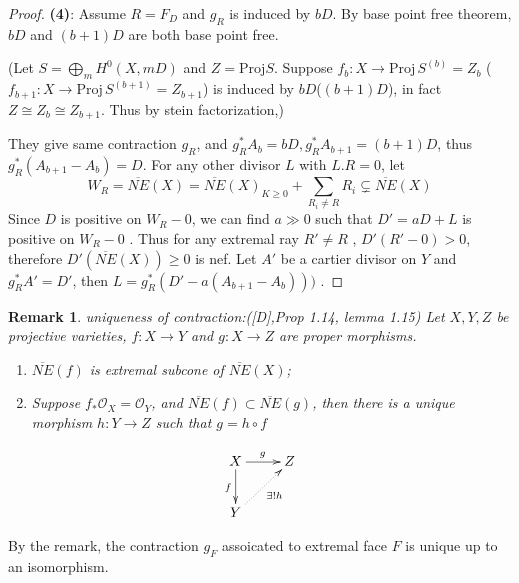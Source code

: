 \documentclass{article}
\newtheorem{rmk}[defn]{Remark}
\begin{document}
\begin{proof}
 \textbf{(4)}: Assume $ R=F_D $ and $ g_R $ is induced by $ bD $. By base point free theorem, $ bD $ and $ (b+1)D $ are both base point free.
 
  (Let $ S=\bigoplus_mH^0(X,mD) $ and $ Z=\mathrm{Proj}S $. Suppose $ f_b:X\to \mathrm{Proj}\,S^{(b)}=Z_b $ ( $ f_{b+1}:X\to \mathrm{Proj}\,S^{(b+1)}=Z_{b+1} $) is induced by $ bD $($ (b+1)D $), in fact  $ Z\cong Z_b\cong Z_{b+1} $. Thus by stein factorization,) 
  
  They give same contraction $ g_R $, and $ g_R^*A_b=bD,g_R^*A_{b+1}=(b+1)D $, thus $ g_R^*(A_{b+1}-A_b)=D $. For any other divisor $ L $ with $ L.R=0 $, let
   $$ W_R=\overline{NE}(X)=\overline{NE}(X)_{K\geqslant0}+\sum_{R_i\neq R} R_i \subsetneq\overline{NE}(X) $$
    Since $ D $ is positive on $ W_R-0 $, we can find $ a\gg0 $ such that $ D'=aD+L $ is positive on $ W_R-0 $ . Thus for any extremal ray $ R'\neq R $ , $ D'(R'-0)>0 $, therefore $ D'(\overline{NE}(X))\geqslant0 $ is nef. Let $ A' $ be a cartier divisor on $ Y $ and $ g_R^*A'=D' $, then $ L=g_R^*(D'-a(A_{b+1}-A_b))) $ .
\end{proof}


\begin{rmk}
	uniqueness of contraction:([D],Prop 1.14, lemma 1.15) Let $ X,Y,Z $ be projective varieties, $ f:X\to Y $ and $ g:X\to Z $ are proper morphisms. 
	\begin{enumerate}
		\item $ \overline{NE}(f) $ is extremal subcone of $ \overline{NE}(X) $;
		\item Suppose $ f_*\mathcal{O}_X=\mathcal{O}_Y $, and $ \overline{NE}(f)\subset \overline{NE}(g) $, then there is a unique morphism $ h:Y\to Z $ such that $ g=h\circ f $
	\end{enumerate}

$$ \xymatrix{
	X\ar[d]_{f}\ar[r]^g&Z\\
	Y\ar@{.>}[ur]_{\exists !h}} $$
\end{rmk}

By the remark, the contraction $ g_F $ assoicated to extremal face $ F $ is unique up to an isomorphism.
\end{document}
